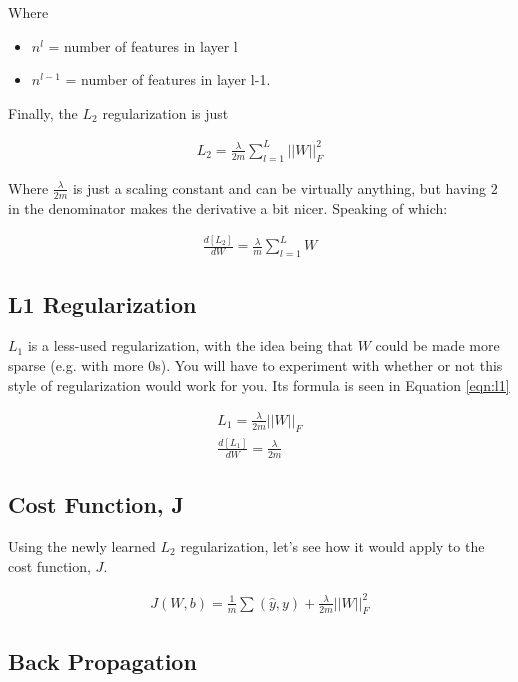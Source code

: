 \documentclass{article}
\begin{document}
Where
\begin{itemize}
\item $n^{l}$ = number of features in layer l
\item $n^{l-1}$ = number of features in layer l-1.
\end{itemize}

Finally, the $L_{2}$ regularization is just

\begin{gather}
L_{2} = \frac{\lambda}{2m} \sum_{l=1}^{L} ||W||_{F}^{2}
\end{gather}

Where $\frac{\lambda}{2m}$ is just a scaling constant and can be virtually anything, but having $2$ in the denominator makes the derivative a bit nicer.  Speaking of which:

\begin{gather}
\frac{d[L_{2}]}{dW} = \frac{\lambda}{m} \sum_{l=1}^{L} W
\end{gather}

\subsection{L1 Regularization}

$L_{1}$ is a less-used regularization, with the idea being that $W$ could be made more sparse (e.g. with more 0s).  You will have to experiment with whether or not this style of regularization would work for you.  Its formula is seen in Equation \ref{eqn:l1}

\begin{gather} \label{eqn:l1}
L_{1} = \frac{\lambda}{2m} ||W||_{F} \\
\frac{d[L_{1}]}{dW} = \frac{\lambda}{2m}
\end{gather}

\subsection{Cost Function, J}

Using the newly learned $L_2$ regularization, let's see how it would apply to the cost function, $J$.

\begin{gather}
J(W, b) = \frac{1}{m} \sum(\hat{y}, y) + \frac{\lambda}{2m} ||W||_{F}^{2}
\end{gather}

\subsection{Back Propagation}
\end{document}

